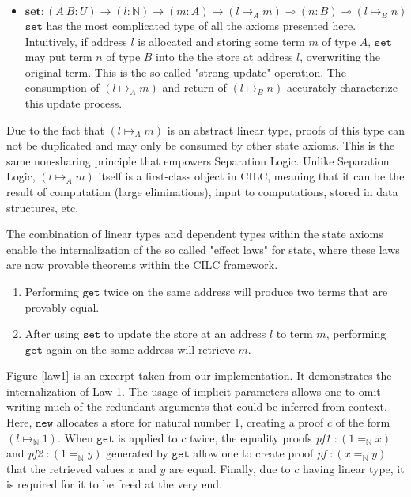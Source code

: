 \documentclass[sigplan,screen,review,anonymous]{acmart}
\newcommand{\new}{\texttt{new}}
\newcommand{\get}{\texttt{get}}
\newcommand{\set}{\texttt{set}}
\begin{document}
\begin{definition}
\begin{itemize}
    \item $\textbf{set} : (A\ B : U) \rightarrow (l : \mathbb{N}) \rightarrow (m : A) \rightarrow (l \mapsto_A m) \multimap (n : B) \multimap (l \mapsto_B n)$ \\
          $\set$ has the most complicated type of all the axioms presented here. Intuitively, if address $l$ is allocated and storing some term $m$ of type $A$, $\set$ may put term $n$ of type $B$ into the the store at address $l$, overwriting the original term. This is the so called "strong update" operation. The consumption of $(l \mapsto_A m)$ and return of $(l \mapsto_B n)$ accurately characterize this update process.
  \end{itemize}
\end{definition}
Due to the fact that $(l \mapsto_A m)$ is an abstract linear type, proofs of this type can not be duplicated and may only be consumed by other state axioms. This is the same non-sharing principle that empowers Separation Logic. Unlike Separation Logic, $(l \mapsto_A m)$ itself is a first-class object in CILC, meaning that it can be the result of computation (large eliminations), input to computations, stored in data structures, etc.

The combination of linear types and dependent types within the state axioms enable the internalization of the so called "effect laws" for state, where these laws are now provable theorems within the CILC framework.

\begin{enumerate}
  \item Performing $\get$ twice on the same address will produce two terms that are provably equal.
  \item After using $\set$ to update the store at an address $l$ to term $m$, performing $\get$ again on the same address will retrieve $m$.
\end{enumerate}

Figure \ref{law1} is an excerpt taken from our implementation. It demonstrates the internalization of Law 1. The usage of implicit parameters allows one to omit writing much of the redundant arguments that could be inferred from context. Here, $\new$ allocates a store for natural number 1, creating a proof $c$ of the form $(l \mapsto_\mathbb{N} 1)$. When $\get$ is applied to $c$ twice, the equality proofs \textit{pf1} $: (1 =_\mathbb{N} x)$ and \textit{pf2} $: (1 =_\mathbb{N} y)$ generated by $\get$ allow one to create proof \textit{pf} $: (x =_\mathbb{N} y)$ that the retrieved values $x$ and $y$ are equal. Finally, due to $c$ having linear type, it is required for it to be freed at the very end.
\end{document}
